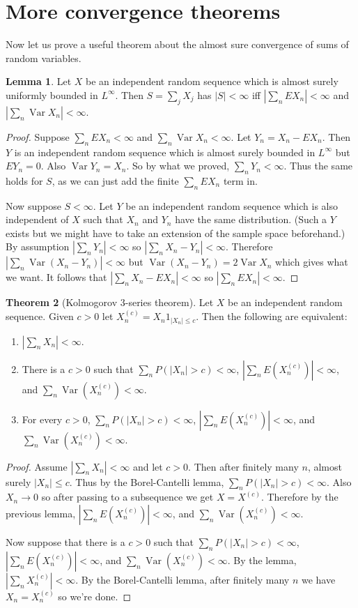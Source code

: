 \documentclass[12pt]{book}
\DeclareMathOperator{\Var}{Var}
\theoremstyle{definition}
\newtheorem{theorem}{Theorem}[chapter]
\newtheorem{lemma}[theorem]{Lemma}
\begin{document}
\section{More convergence theorems}
Now let us prove a useful theorem about the almost sure convergence of sums of random variables.

\begin{lemma}
Let $X$ be an independent random sequence which is almost surely uniformly bounded in $L^\infty$.
Then $S = \sum_j X_j$ has $|S| < \infty$ iff $|\sum_n EX_n| < \infty$ and $|\sum_n \Var X_n| < \infty$.
\end{lemma}
\begin{proof}
Suppose $\sum_n EX_n < \infty$ and $\sum_n \Var X_n < \infty$.
Let $Y_n = X_n - EX_n$. Then $Y$ is an independent random sequence which is almost surely bounded in $L^\infty$ but $EY_n = 0$.
Also $\Var Y_n = X_n$.
So by what we proved, $\sum_n Y_n < \infty$.
Thus the same holds for $S$, as we can just add the finite $\sum_n EX_n$ term in.

Now suppose $S < \infty$.
Let $Y$ be an independent random sequence which is also independent of $X$ such that $X_n$ and $Y_n$ have the same distribution.
(Such a $Y$ exists but we might have to take an extension of the sample space beforehand.)
By assumption $|\sum_n Y_n| < \infty$ so $|\sum_n X_n - Y_n| < \infty$.
Therefore $|\sum_n \Var (X_n - Y_n)| < \infty$ but $\Var(X_n - Y_n) = 2 \Var X_n$ which gives what we want.
It follows that $|\sum_n X_n - EX_n| < \infty$ so $|\sum_n EX_n| < \infty$.
\end{proof}

\begin{theorem}[Kolmogorov $3$-series theorem]
Let $X$ be an independent random sequence. Given $c > 0$ let $X_n^{(c)} = X_n 1_{|X_n| \leq c}$.
Then the following are equivalent:
\begin{enumerate}
\item $|\sum_n X_n| < \infty$.
\item There is a $c > 0$ such that $\sum_n P(|X_n| > c) < \infty$, $|\sum_n E(X_n^{(c)})| < \infty$, and $\sum_n \Var(X_n^{(c)}) < \infty$.
\item For every $c > 0$, $\sum_n P(|X_n| > c) < \infty$, $|\sum_n E(X_n^{(c)})| < \infty$, and $\sum_n \Var(X_n^{(c)}) < \infty$.
\end{enumerate}
\end{theorem}
\begin{proof}
Assume $|\sum_n X_n| < \infty$ and let $c > 0$. Then after finitely many $n$, almost surely $|X_n| \leq c$.
Thus by the Borel-Cantelli lemma, $\sum_n P(|X_n| > c) < \infty$.
Also $X_n \to 0$ so after passing to a subsequence we get $X = X^{(c)}$.
Therefore by the previous lemma, $|\sum_n E(X_n^{(c)})| < \infty$, and $\sum_n \Var(X_n^{(c)}) < \infty$.

Now suppose that there is a $c > 0$ such that $\sum_n P(|X_n| > c) < \infty$, $|\sum_n E(X_n^{(c)})| < \infty$, and $\sum_n \Var(X_n^{(c)}) < \infty$.
By the lemma, $|\sum_n X_n^{(c)}| < \infty$.
By the Borel-Cantelli lemma, after finitely many $n$ we have $X_n = X_n^{(c)}$ so we're done.
\end{proof}
\end{document}
